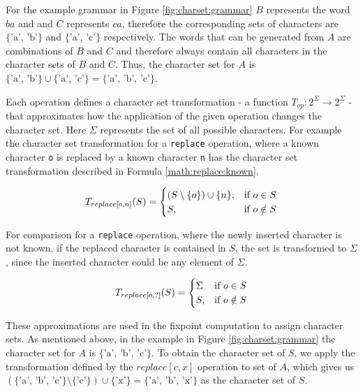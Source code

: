 For the example grammar in Figure \ref{fig:charset:grammar} $B$ represents the word $ba$ and and $C$ represents $ca$, therefore the corresponding sets of characters are  $\{\text{'a', 'b'}\}$ and  $\{\text{'a', 'c'}\}$ respectively. The words that can be generated from $A$ are combinations of $B$ and $C$ and therefore always contain all characters in the character sets of $B$ and $C$. Thus, the character set for $A$ is $\{\text{'a', 'b'}\} \cup \{\text{'a', 'c'}\} = \{\text{'a', 'b', 'c'}\}$.

Each operation defines a character set transformation - a function $T_{op} : 2^\Sigma \rightarrow 2^\Sigma$ - that approximates how the application of the given operation changes the character set. Here $\Sigma$ represents the set of all possible characters.
For example the character set transformation for a \lstinline|replace| operation, where a known character \lstinline|o| is replaced by a known character \lstinline|n| has the character set transformation described in Formula \ref{math:replace:known}.

\begin{align}
	\centering
	T_{replace[o, n]}(S) = 
	\begin{cases}
		(S \setminus \{o\}) \cup \{n\}, & \text{if } o \in S\\
		S, & \text{if } o \notin S
	\end{cases}
	\label{math:replace:known}
\end{align}

For comparison for a \lstinline|replace| operation, where the newly inserted character is not known, if the replaced character is contained in $S$, the set is transformed to $\Sigma$, since the inserted character could be any element of $\Sigma$.

\begin{align}
	\centering
	T_{replace[o, ?]}(S) = 
	\begin{cases}
		\Sigma & \text{if } o \in S\\
		S, & \text{if } o \notin S
	\end{cases}
	\label{math:replace:unknown}
\end{align}

These approximations are used in the fixpoint computation to assign character sets.
As mentioned above, in the example in Figure \ref{fig:charset:grammar} the character set for $A$ is $\{\text{'a', 'b', 'c'}\}$. To obtain the character set of $S$, we apply the transformation defined by the $replace[c,x]$ operation to set of $A$, which gives us $(\{\text{'a', 'b', 'c'}\} \setminus \{\text{'c'}\}) \cup \{\text{'x'}\} = \{\text{'a', 'b', 'x'}\}$ as the character set of $S$.

